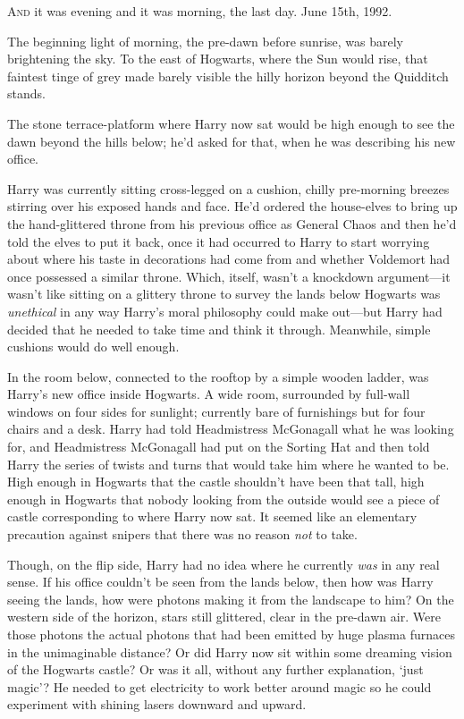 
\lettrine{A}{nd} it was
evening and it was morning, the last day. June 15th, 1992.

The beginning light of morning, the pre-dawn before sunrise, was barely
brightening the sky. To the east of Hogwarts, where the Sun would rise, that
faintest tinge of grey made barely visible the hilly horizon beyond the
Quidditch stands.

The stone terrace-platform where Harry now sat would be high enough to see the
dawn beyond the hills below; he'd asked for that, when he was describing his
new office.

Harry was currently sitting cross-legged on a cushion, chilly pre-morning
breezes stirring over his exposed hands and face. He'd ordered the house-elves
to bring up the hand-glittered throne from his previous office as General
Chaos{\el} and then he'd told the elves to put it back, once it had occurred
to Harry to start worrying about where his taste in decorations had come from
and whether Voldemort had once possessed a similar throne. Which, itself,
wasn't a knockdown argument—it wasn't like sitting on a glittery throne to
survey the lands below Hogwarts was \emph{unethical} in any way Harry's moral
philosophy could make out—but Harry had decided that he needed to take time
and think it through. Meanwhile, simple cushions would do well enough.

In the room below, connected to the rooftop by a simple wooden ladder, was
Harry's new office inside Hogwarts. A wide room, surrounded by full-wall
windows on four sides for sunlight; currently bare of furnishings but for four
chairs and a desk. Harry had told Headmistress McGonagall what he was looking
for, and Headmistress McGonagall had put on the Sorting Hat and then told Harry
the series of twists and turns that would take him where he wanted to be. High
enough in Hogwarts that the castle shouldn't have been that tall, high enough
in Hogwarts that nobody looking from the outside would see a piece of castle
corresponding to where Harry now sat. It seemed like an elementary precaution
against snipers that there was no reason \emph{not} to take.

Though, on the flip side, Harry had no idea where he currently \emph{was} in
any real sense. If his office couldn't be seen from the lands below, then how
was Harry seeing the lands, how were photons making it from the landscape to
him? On the western side of the horizon, stars still glittered, clear in the
pre-dawn air. Were those photons the actual photons that had been emitted by
huge plasma furnaces in the unimaginable distance? Or did Harry now sit within
some dreaming vision of the Hogwarts castle? Or was it all, without any further
explanation, `just magic'? He needed to get electricity to work better around
magic so he could experiment with shining lasers downward and upward.

